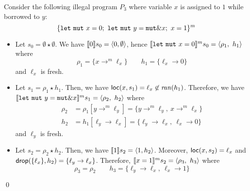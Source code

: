 \begin{example}
  Consider the following illegal program $P_3$
  where variable $x$ is assigned to $1$ while
  borrowed to $y$:
  \[
    \{
      \mathtt{let\ mut}\ x = 0;\
      \mathtt{let\ mut}\ y = \mathtt{mut}\borrow x;\
      x = 1
    \}^m
  \]
  \begin{itemize}
    \item Let $s_0=\emptyset \star \emptyset$.
    We have $\den[0]{s_0} = \langle 0,\emptyset\rangle$, hence
    $\denl[\mathtt{let\ mut}\ x = 0]{m}{s_0} =
    \langle \rho_1,\ h_1\rangle$ where
    \[\rho_1=\{x\to^m\ell_x\} \qquad
    h_1 = \{\ell_x\to 0\}\]
    and $\ell_x$ is fresh.
    \item Let $s_1 = \rho_1 \star h_1$.
    Then, we have
    $\loc(x,s_1) = \ell_x \not\in\ran(h_1)$.
    Therefore, we have
    $\denl[\mathtt{let\ mut}\ y = \mathtt{mut}\borrow x]{m}{s_1} =
    \langle \rho_2,\ h_2\rangle$
    where
    \begin{align*}
      \rho_2 & = \rho_1[y\to^m\ell_y] = \{y\to^m\ell_y,\ x\to^m\ell_x\}\\
      h_2 & = h_1[\ell_y\to \ell_x] =
      \{\ell_y\to \ell_x,\ \ell_x\to 0\}
    \end{align*}
    and $\ell_y$ is fresh.
    \item Let $s_2 = \rho_2 \star h_2$.
    Then, we have $\den[1]{s_2} = \langle 1,h_2\rangle$.
    Moreover,
    $\loc(x,s_2) = \ell_x$ and
    $\drop(\{\ell_x\}, h_2) = \{\ell_y\to \ell_x\}$.
    Therefore,
    $\denl[x = 1]{m}{s_2} =
    \langle \rho_3,\ h_3\rangle$
    where
    \[\rho_3 = \rho_2 \qquad
    h_3 = \{\ell_y\to \ell_x,\ \ell_x\to 1\}
    \]
  \end{itemize}
  \qed
\end{example}
